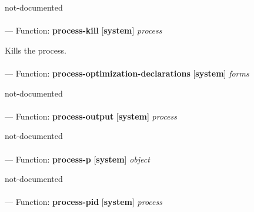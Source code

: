 \begin{adjustwidth}{5em}{5em}
not-documented
\end{adjustwidth}

\paragraph{}
\label{SYSTEM:PROCESS-KILL}
--- Function: \textbf{process-kill} [\textbf{system}] \textit{process}

\begin{adjustwidth}{5em}{5em}
Kills the process.
\end{adjustwidth}

\paragraph{}
\label{SYSTEM:PROCESS-OPTIMIZATION-DECLARATIONS}
--- Function: \textbf{process-optimization-declarations} [\textbf{system}] \textit{forms}

\begin{adjustwidth}{5em}{5em}
not-documented
\end{adjustwidth}

\paragraph{}
\label{SYSTEM:PROCESS-OUTPUT}
--- Function: \textbf{process-output} [\textbf{system}] \textit{process}

\begin{adjustwidth}{5em}{5em}
not-documented
\end{adjustwidth}

\paragraph{}
\label{SYSTEM:PROCESS-P}
--- Function: \textbf{process-p} [\textbf{system}] \textit{object}

\begin{adjustwidth}{5em}{5em}
not-documented
\end{adjustwidth}

\paragraph{}
\label{SYSTEM:PROCESS-PID}
--- Function: \textbf{process-pid} [\textbf{system}] \textit{process}

